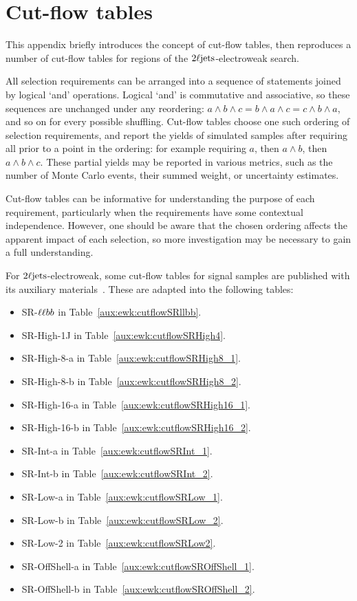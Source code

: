 \chapter{Cut-flow tables}
\label{app:2ljets_cut_flows}

This appendix briefly introduces the concept of cut-flow tables, then
reproduces a number of cut-flow tables for regions of the
$2\ell\mathrm{jets}$-electroweak search.

All selection requirements can be arranged into a sequence of statements joined
by logical `and' operations.
Logical `and' is commutative and associative, so these sequences are unchanged
under any reordering:
$a \land b \land c = b \land a \land c = c \land b \land a$, and so on for
every possible shuffling.
Cut-flow tables choose one such ordering of selection requirements, and report
the yields of simulated samples after requiring all prior to a point in the
ordering: for example requiring
$a$, then $a \land b$, then $a \land b \land c$.
These partial yields may be reported in various metrics, such as the number
of Monte Carlo events, their summed weight, or uncertainty estimates.

Cut-flow tables can be informative for understanding the purpose of each
requirement, particularly when the requirements have some contextual
independence.
However, one should be aware that the chosen ordering affects the apparent
impact of each selection, so more investigation may be necessary to gain a full
understanding.

For $2\ell\mathrm{jets}$-electroweak, some cut-flow tables for signal samples are
published with its auxiliary materials~\cite{hepdata.116034}.
These are adapted into the following tables:
\begin{itemize}
\item SR-$\ell\ell bb$ in Table~\ref{aux:ewk:cutflowSRllbb}.
\item SR-High-1J in Table~\ref{aux:ewk:cutflowSRHigh4}.
\item SR-High-8-a in Table~\ref{aux:ewk:cutflowSRHigh8_1}.
\item SR-High-8-b in Table~\ref{aux:ewk:cutflowSRHigh8_2}.
\item SR-High-16-a in Table~\ref{aux:ewk:cutflowSRHigh16_1}.
\item SR-High-16-b in Table~\ref{aux:ewk:cutflowSRHigh16_2}.
\item SR-Int-a in Table~\ref{aux:ewk:cutflowSRInt_1}.
\item SR-Int-b in Table~\ref{aux:ewk:cutflowSRInt_2}.
\item SR-Low-a in Table~\ref{aux:ewk:cutflowSRLow_1}.
\item SR-Low-b in Table~\ref{aux:ewk:cutflowSRLow_2}.
\item SR-Low-2 in Table~\ref{aux:ewk:cutflowSRLow2}.
\item SR-OffShell-a in Table~\ref{aux:ewk:cutflowSROffShell_1}.
\item SR-OffShell-b in Table~\ref{aux:ewk:cutflowSROffShell_2}.
\end{itemize}

